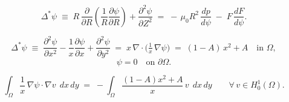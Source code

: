 

\[
\Delta^{*}\psi
\;\equiv\; R\,\frac{\partial}{\partial R}\!\left(\frac{1}{R}\frac{\partial \psi}{\partial R}\right)
+ \frac{\partial^{2}\psi}{\partial Z^{2}}
\;=\; -\,\mu_{0}R^{2}\,\frac{dp}{d\psi} \;-\; F\,\frac{dF}{d\psi}.
\]

\[
\Delta^{*}\psi
\;\equiv\;\frac{\partial^{2}\psi}{\partial x^{2}}
-\frac{1}{x}\frac{\partial \psi}{\partial x}
+\frac{\partial^{2}\psi}{\partial y^{2}}
\;=\; x\,\nabla\!\cdot\!\Big(\tfrac{1}{x}\,\nabla\psi\Big)
\;=\;(1-A)\,x^{2}+A
\quad \text{in } \Omega,
\]
\[
\psi = 0 \quad \text{on } \partial\Omega .
\]

\[
\int_{\Omega}\frac{1}{x}\,\nabla\psi\cdot\nabla v \;\, dx\,dy
\;=\;
-\int_{\Omega}\frac{(1-A)x^{2}+A}{x}\,v \;\, dx\,dy
\qquad \forall\, v \in H_{0}^{1}(\Omega).
\]
